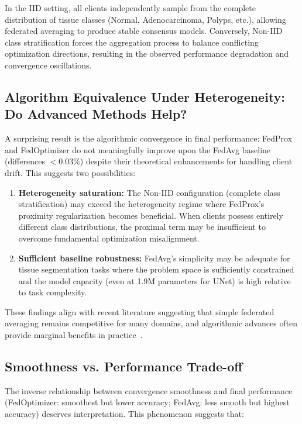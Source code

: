 \documentclass[conference]{IEEEtran}
\begin{document}
In the IID setting, all clients independently sample from the complete distribution of tissue classes (Normal, Adenocarcinoma, Polyps, etc.), allowing federated averaging to produce stable consensus models. Conversely, Non-IID class stratification forces the aggregation process to balance conflicting optimization directions, resulting in the observed performance degradation and convergence oscillations.

\subsection{Algorithm Equivalence Under Heterogeneity: Do Advanced Methods Help?}

A surprising result is the algorithmic convergence in final performance: FedProx and FedOptimizer do not meaningfully improve upon the FedAvg baseline (differences $<0.03\%$) despite their theoretical enhancements for handling client drift. This suggests two possibilities:

\begin{enumerate}
\item \textbf{Heterogeneity saturation:} The Non-IID configuration (complete class stratification) may exceed the heterogeneity regime where FedProx's proximity regularization becomes beneficial. When clients possess entirely different class distributions, the proximal term may be insufficient to overcome fundamental optimization misalignment.

\item \textbf{Sufficient baseline robustness:} FedAvg's simplicity may be adequate for tissue segmentation tasks where the problem space is sufficiently constrained and the model capacity (even at 1.9M parameters for UNet) is high relative to task complexity.
\end{enumerate}

These findings align with recent literature suggesting that simple federated averaging remains competitive for many domains, and algorithmic advances often provide marginal benefits in practice~\cite{LL1,LL2,LL3}.

\subsection{Smoothness vs. Performance Trade-off}

The inverse relationship between convergence smoothness and final performance (FedOptimizer: smoothest but lower accuracy; FedAvg: less smooth but highest accuracy) deserves interpretation. This phenomenon suggests that:
\end{document}
